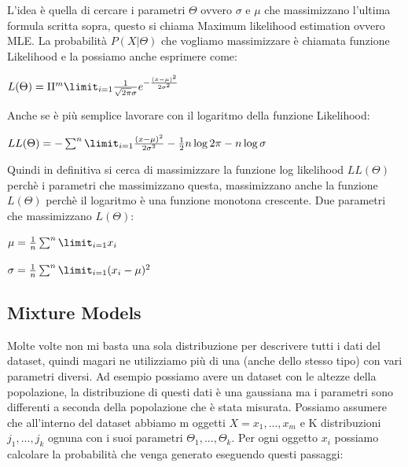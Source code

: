 \documentclass[14pt]{extreport}
\begin{document}
L'idea è quella di cercare i parametri $\Theta$ ovvero $\sigma$ e $\mu$ che massimizzano l'ultima formula scritta sopra, questo si chiama Maximum likelihood estimation ovvero MLE.
La probabilità $P(X|\Theta)$ che vogliamo massimizzare è chiamata funzione Likelihood e la possiamo anche esprimere come:
\newline
\centerline{$L(\Theta) = \Pi^m \limit_{i=1} \frac{1}{\sqrt{2\pi}\sigma}e^{-\frac{(x-\mu)^2}{2\sigma^2}}$}

Anche se è più semplice lavorare con il logaritmo della funzione Likelihood:

\centerline{$LL(\Theta) = - \sum^n \limit_{i=1} \frac{(x-\mu)^2}{2\sigma^2} - \frac{1}{2}n\log2\pi - n\log\sigma$}

Quindi in definitiva si cerca di massimizzare la funzione log likelihood $LL(\Theta)$ perchè i parametri che massimizzano questa, massimizzano anche la funzione $L(\Theta)$ perchè il logaritmo è una funzione monotona crescente.
Due parametri che massimizzano $L(\Theta)$:
\newline
\centerline{$\mu = \frac{1}{n}\sum^n \limit_{i=1} x_i $}

\newline
\centerline{$\sigma = \frac{1}{n}\sum^n \limit_{i=1} (x_i-\mu)^2 $}

\subsection{Mixture Models}

Molte volte non mi basta una sola distribuzione per descrivere tutti i dati del dataset, quindi magari ne utilizziamo più di una (anche dello stesso tipo) con vari parametri diversi.
Ad esempio possiamo avere un dataset con le altezze della popolazione, la distribuzione di questi dati è una gaussiana ma i parametri sono differenti a seconda della popolazione che è stata misurata.
Possiamo assumere che all'interno del dataset abbiamo m oggetti $X={x_1,..., x_m}$ e K distribuzioni $j_1,...,j_k$ ognuna con i suoi parametri $\Theta_1,..., \Theta_k$.
Per ogni oggetto $x_i$ possiamo calcolare la probabilità che venga generato eseguendo questi passaggi:
\end{document}
